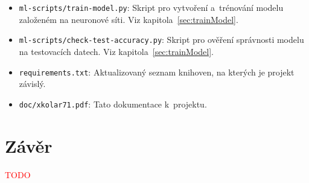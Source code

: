 \documentclass[11pt, a4paper]{article}
\theoremstyle{definition}
\begin{document}
\begin{itemize}
    \item
        \texttt{ml-scripts/train-model.py}: Skript pro vytvoření a~trénování
        modelu založeném na neuronové síti. Viz kapitola~\ref{sec:trainModel}.

    \item
        \texttt{ml-scripts/check-test-accuracy.py}: Skript pro ověření
        správnosti modelu na testovacích datech. Viz
        kapitola~\ref{sec:trainModel}.

    \item
        \texttt{requirements.txt}: Aktualizovaný seznam knihoven, na
        kterých je projekt závislý.

    \item
        \texttt{doc/xkolar71.pdf}: Tato dokumentace k~projektu.
\end{itemize}


\section{Závěr}
\label{sec:con}

\textcolor{red}{TODO}


\end{document}
